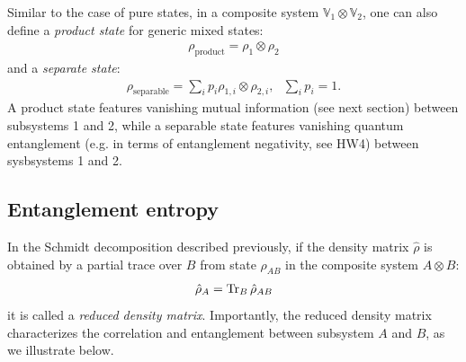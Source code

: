 Similar to the case of pure states, in a composite system $\mathbb{V}_1\otimes\mathbb{V}_2$, one can also define a \emph{product state} for generic mixed states:
\begin{align}
    \rho_\text{product}=\rho_1\otimes\rho_2
\end{align}
and a \emph{separate state}:
\begin{align}
    \rho_\text{separable}=\sum_i p_i\rho_{1,i}\otimes\rho_{2,i},~~~\sum_ip_i=1.
\end{align}
A product state features vanishing mutual information (see next section) between subsystems 1 and 2, while a separable state features vanishing quantum entanglement (e.g. in terms of entanglement negativity, see HW4) between sysbsystems 1 and 2. 


\subsection{Entanglement entropy}

In the Schmidt decomposition described previously, if the density matrix $\hat\rho$ is obtained by a partial trace over $B$ from state $\rho_{AB}$ in the composite system $A\otimes B$:
\begin{align}
\hat\rho_A=\operatorname{Tr}_B\hat\rho_{AB}
\end{align}
it is called a \emph{reduced density matrix}. Importantly, the reduced density matrix characterizes the correlation and entanglement between subsystem $A$ and $B$, as we illustrate below. 



